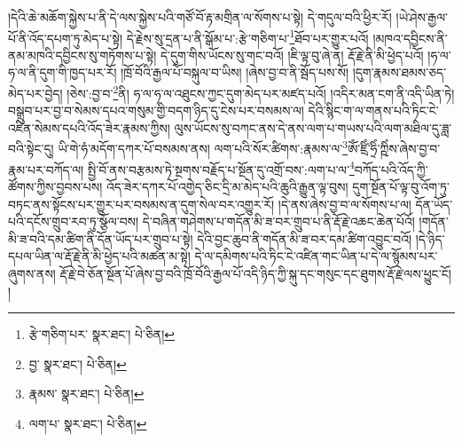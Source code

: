 །དེའི་ཆེ་མཆོག་སྐྱེས་པ་ནི་དེ་ལས་སྐྱེས་པའི་གཙོ་བོ་རྟ་མགྲིན་ལ་སོགས་པ་སྟེ། དེ་གདུལ་བའི་ཕྱིར་རོ། །ཡེ་ཤེས་རྒྱལ་པོ་ནི་འོད་དཔག་ཏུ་མེད་པ་སྟེ། དེ་རྗེས་སུ་དྲན་པ་ནི་སྒོམ་པ་:རྩེ་གཅིག་པ་\footnote{རྩེ་གཅིག་པར་  སྣར་ཐང་།  པེ་ཅིན། }ཐོབ་པར་གྱུར་པའོ། །མཁའ་དབྱིངས་ནི་ནམ་མཁའི་དབྱིངས་སུ་གཏོགས་པ་སྟེ། དེ་དུག་གིས་ཡོངས་སུ་གང་བའོ། །ཇི་ལྟ་བུ་ཞེ་ན། རྡོ་རྗེ་ནི་མི་ཕྱེད་པའོ། །ཧ་ལ་ཧ་ལ་ནི་དུག་གི་ཁྱད་པར་རོ། །ཁྲོ་བོའི་རྒྱལ་པོ་བསྐུལ་བ་ཡིས། །ཞེས་བྱ་བ་ནི་སྦོད་པས་སོ། །དུག་རྣམས་ཐམས་ཅད་མེད་པར་བྱེད། །ཅེས་:བྱ་བ་\footnote{བྱ་  སྣར་ཐང་།  པེ་ཅིན། }ནི། ཧ་ལ་ཧ་ལ་འཐུངས་ཀྱང་དུག་མེད་པར་མཛད་པའོ། །འདིར་མན་ངག་ནི་འདི་ཡིན་ཏེ། བསྒྲུབ་པར་བྱ་བ་སེམས་དཔའ་གསུམ་གྱི་བདག་ཉིད་དུ་ངེས་པར་བསམས་ལ། དེའི་སྙིང་ག་ལ་གནས་པའི་ཏིང་ངེ་འཛིན་སེམས་དཔའི་འོད་ཟེར་རྣམས་ཀྱིས། ལུས་ཡོངས་སུ་བཀང་ནས་དེ་ནས་ལག་པ་གཡས་པའི་ལག་མཐིལ་དུ་ཟླ་བའི་སྟེང་དུ། ཡི་གེ་ཧཾ་མདོག་དཀར་པོ་བསམས་ནས། ལག་པའི་སོར་ཚིགས་:རྣམས་ལ་\footnote{རྣམས་  སྣར་ཐང་།  པེ་ཅིན། }ཨོཾ་ཛྲིཾ་ཧྲིཾ་ཀྵིཾས་ཞེས་བྱ་བ་རྣམ་པར་བཀོད་ལ། སྤྱི་བོ་ནས་བརྩམས་ཏེ་སྔགས་བརྗོད་པ་སྔོན་དུ་འགྲོ་བས་:ལག་པ་ལ་\footnote{ལག་པ་  སྣར་ཐང་།  པེ་ཅིན། }བཀོད་པའི་འོད་ཀྱི་ཚོགས་ཀྱིས་བྱབས་པས། འོད་ཟེར་དཀར་པོ་འགྱེད་ཅིང་དྲི་མ་མེད་པའི་ཆུའི་རྒྱུན་ལྟ་བུས། དུག་སྔོན་པོ་ལྟ་བུ་འོག་ཏུ་བཏང་ནས་སྟོངས་པར་གྱུར་པར་བསམས་ན་དུག་སེལ་བར་འགྱུར་རོ། །དེ་ནས་ཞེས་བྱ་བ་ལ་སོགས་པ་ལ། དོན་ཡོད་པའི་དངོས་གྲུབ་རབ་ཏུ་སྩོལ་བས། དེ་བཞིན་གཤེགས་པ་གདོན་མི་ཟ་བར་གྲུབ་པ་ནི་རྡོ་རྗེ་འཆང་ཆེན་པོའོ། །གདོན་མི་ཟ་བའི་དམ་ཚིག་ནི་དོན་ཡོད་པར་གྲུབ་པ་སྟེ། དེའི་བྱང་ཆུབ་ནི་གདོན་མི་ཟ་བར་དམ་ཚིག་འབྱུང་བའོ། །དེ་ཉིད་དཔལ་ཡིན་ལ་རྡོ་རྗེ་ནི་མི་ཕྱེད་པའི་མཚན་མ་སྟེ། དེ་ལ་དམིགས་པའི་ཏིང་ངེ་འཛིན་གང་ཡིན་པ་དེ་ལ་སྙོམས་པར་ཞུགས་ནས། རྡོ་རྗེ་བེ་ཅོན་སྔོན་པོ་ཞེས་བྱ་བའི་ཁྲོ་བོའི་རྒྱལ་པོ་འདི་ཉིད་ཀྱི་སྐུ་དང་གསུང་དང་ཐུགས་རྡོ་རྗེ་ལས་ཕྱུང་ངོ། །
